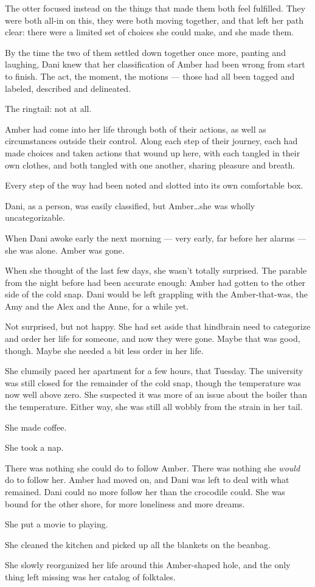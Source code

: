 The otter focused instead on the things that made them both feel fulfilled. They were both all-in on this, they were both moving together, and that left her path clear: there were a limited set of choices she could make, and she made them.

By the time the two of them settled down together once more, panting and laughing, Dani knew that her classification of Amber had been wrong from start to finish. The act, the moment, the motions --- those had all been tagged and labeled, described and delineated.

The ringtail: not at all.

Amber had come into her life through both of their actions, as well as circumstances outside their control. Along each step of their journey, each had made choices and taken actions that wound up here, with each tangled in their own clothes, and both tangled with one another, sharing pleasure and breath.

Every step of the way had been noted and slotted into its own comfortable box.

Dani, as a person, was easily classified, but Amber\ldots{}she was wholly uncategorizable.

\secdiv

When Dani awoke early the next morning --- very early, far before her alarms --- she was alone. Amber was gone.

When she thought of the last few days, she wasn't totally surprised. The parable from the night before had been accurate enough: Amber had gotten to the other side of the cold snap. Dani would be left grappling with the Amber-that-was, the Amy and the Alex and the Anne, for a while yet.

Not surprised, but not happy. She had set aside that hindbrain need to categorize and order her life for someone, and now they were gone. Maybe that was good, though. Maybe she needed a bit less order in her life.

She clumsily paced her apartment for a few hours, that Tuesday. The university was still closed for the remainder of the cold snap, though the temperature was now well above zero. She suspected it was more of an issue about the boiler than the temperature. Either way, she was still all wobbly from the strain in her tail.

She made coffee.

She took a nap.

There was nothing she could do to follow Amber. There was nothing she \emph{would} do to follow her. Amber had moved on, and Dani was left to deal with what remained. Dani could no more follow her than the crocodile could. She was bound for the other shore, for more loneliness and more dreams.

She put a movie to playing.

She cleaned the kitchen and picked up all the blankets on the beanbag.

She slowly reorganized her life around this Amber-shaped hole, and the only thing left missing was her catalog of folktales.
